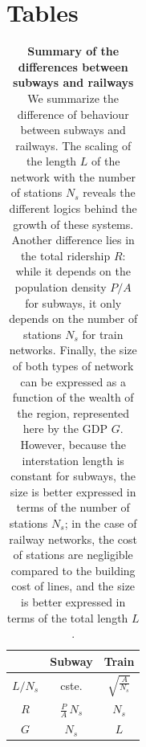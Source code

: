 \section*{Tables}
\begin{table}[!ht]
\centering
\begin{tabular}{|c|c|c|}
\hline
 & {\bf Subway} & {\bf Train} \\
 \hline
$L / N_s$ & cste. & $\sqrt{\frac{A}{N_s}}$\\
$R$ & $\frac{P}{A}\,N_s$ & $N_s$ \\
$G$ & $N_s$ & $L$ \\
\hline
\end{tabular}
\caption{{\bf Summary of the differences between subways and railways}
We summarize the difference of behaviour between subways and railways. The
scaling of the length $L$ of the network with the number of stations $N_s$
reveals the different logics behind the growth of these systems. Another
difference lies in the total ridership $R$: while it depends on the population
density $P/A$ for subways, it only depends on the number of stations $N_s$ for
train networks. Finally, the size of both types of network can be expressed as a
function of the wealth of the region, represented here by the GDP $G$. However,
because the interstation length is constant for subways, the size is better
expressed in terms of the number of stations $N_s$; in the case of railway
networks, the cost of stations are negligible compared to the building cost of
lines, and the size is better expressed in terms of the total length $L$.
\label{table:summary}} 
\label{tab:label} 
\end{table}
